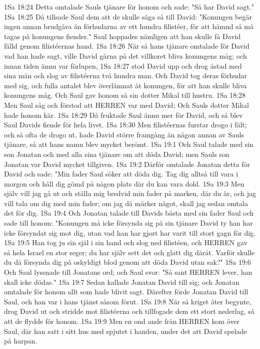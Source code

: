 1Sa 18:24  Detta omtalade Sauls tjänare för honom och sade: "Så har David sagt."
1Sa 18:25  Då tillsade Saul dem att de skulle säga så till David: "Konungen begär ingen annan brudgåva än förhudarna av ett hundra filistéer, för att hämnd så må tagas på konungens fiender." Saul hoppades nämligen att han skulle få David fälld genom filistéernas hand.
1Sa 18:26  När så hans tjänare omtalade för David vad han hade sagt, ville David gärna på det villkoret bliva konungens måg; och innan tiden ännu var förlupen,
1Sa 18:27  stod David upp och drog åstad med sina män och slog av filistéerna två hundra man. Och David tog deras förhudar med sig, och fulla antalet blev överlämnat åt konungen, för att han skulle bliva konungens måg. Och Saul gav honom så sin dotter Mikal till hustru.
1Sa 18:28  Men Saul såg och förstod att HERREN var med David; Och Sauls dotter Mikal hade honom kär.
1Sa 18:29  Då fruktade Saul ännu mer för David, och så blev Saul Davids fiende för hela livet.
1Sa 18:30  Men filistéernas furstar drogo i fält; och så ofta de drogo ut, hade David större framgång än någon annan av Sauls tjänare, så att hans namn blev mycket berömt.
1Sa 19:1  Och Saul talade med sin son Jonatan och med alla sina tjänare om att döda David; men Sauls son Jonatan var David mycket tillgiven.
1Sa 19:2  Därför omtalade Jonatan detta för David och sade: "Min fader Saul söker att döda dig. Tag dig alltså till vara i morgon och håll dig gömd på någon plats där du kan vara dold.
1Sa 19:3  Men själv vill jag gå ut och ställa mig bredvid min fader på marken, där du är, och jag vill tala om dig med min fader; om jag då märker något, skall jag sedan omtala det för dig.
1Sa 19:4  Och Jonatan talade till Davids bästa med sin fader Saul och sade till honom: "Konungen må icke försynda sig på sin tjänare David ty han har icke försyndat sig mot dig, utan vad han har gjort har varit till stort gagn för dig.
1Sa 19:5  Han tog ju sin själ i sin hand och slog ned filistéen, och HERREN gav så hela Israel en stor seger; du har själv sett det och glatt dig däråt. Varför skulle du då försynda dig på oskyldigt blod genom att döda David utan sak?"
1Sa 19:6  Och Saul lyssnade till Jonatans ord; och Saul svor: "Så sant HERREN lever, han skall icke dödas."
1Sa 19:7  Sedan kallade Jonatan David till sig; och Jonatan omtalade för honom allt som hade blivit sagt. Därefter förde Jonatan David till Saul, och han var i hans tjänst såsom förut.
1Sa 19:8  När så kriget åter begynte, drog David ut och stridde mot filistéerna och tillfogade dem ett stort nederlag, så att de flydde för honom.
1Sa 19:9  Men en ond ande från HERREN kom över Saul, där han satt i sitt hus med spjutet i handen, under det att David spelade på harpan.
